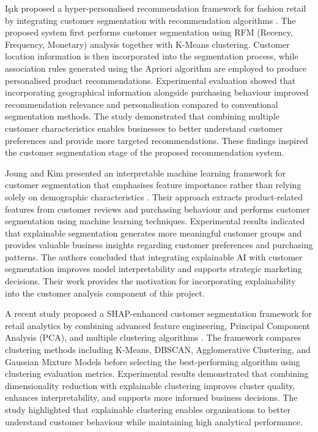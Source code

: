 \documentclass[12pt]{report}
\numberwithin{figure}{chapter}
\numberwithin{table}{chapter}
\numberwithin{equation}{chapter}
\begin{document}
I\c{s}\i k proposed a hyper-personalised recommendation framework for fashion retail by integrating customer segmentation with recommendation algorithms \cite{isik}. The proposed system first performs customer segmentation using RFM (Recency, Frequency, Monetary) analysis together with K-Means clustering. Customer location information is then incorporated into the segmentation process, while association rules generated using the Apriori algorithm are employed to produce personalised product recommendations. Experimental evaluation showed that incorporating geographical information alongside purchasing behaviour improved recommendation relevance and personalisation compared to conventional segmentation methods. The study demonstrated that combining multiple customer characteristics enables businesses to better understand customer preferences and provide more targeted recommendations. These findings inspired the customer segmentation stage of the proposed recommendation system.

Joung and Kim presented an interpretable machine learning framework for customer segmentation that emphasises feature importance rather than relying solely on demographic characteristics \cite{joung}. Their approach extracts product-related features from customer reviews and purchasing behaviour and performs customer segmentation using machine learning techniques. Experimental results indicated that explainable segmentation generates more meaningful customer groups and provides valuable business insights regarding customer preferences and purchasing patterns. The authors concluded that integrating explainable AI with customer segmentation improves model interpretability and supports strategic marketing decisions. Their work provides the motivation for incorporating explainability into the customer analysis component of this project.

A recent study proposed a SHAP-enhanced customer segmentation framework for retail analytics by combining advanced feature engineering, Principal Component Analysis (PCA), and multiple clustering algorithms \cite{pcadbscan}. The framework compares clustering methods including K-Means, DBSCAN, Agglomerative Clustering, and Gaussian Mixture Models before selecting the best-performing algorithm using clustering evaluation metrics. Experimental results demonstrated that combining dimensionality reduction with explainable clustering improves cluster quality, enhances interpretability, and supports more informed business decisions. The study highlighted that explainable clustering enables organisations to better understand customer behaviour while maintaining high analytical performance.
\end{document}
